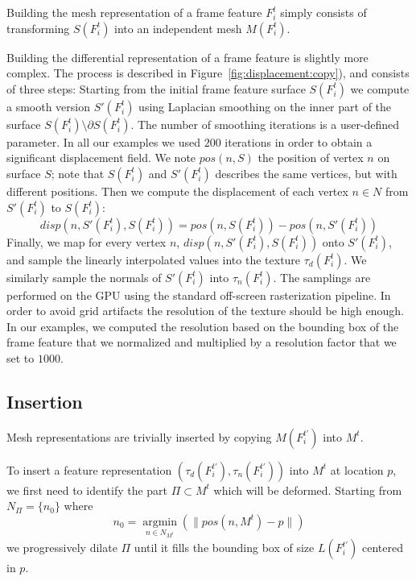 \documentclass[review]{acmsiggraph}
\begin{document}
Building the mesh representation of a frame feature $F^t_i$ simply consists of transforming $S(F^t_i)$ into an independent mesh $M(F^t_i)$.

Building the differential representation of a frame feature is slightly more complex.
The process is described in Figure~\ref{fig:displacement:copy}), and consists of three steps:
%
Starting from the initial frame feature surface $S(F^t_i)$ we compute a smooth version $S'(F^t_i)$ using Laplacian smoothing on the inner part of the surface $S(F^t_i) \setminus \partial S(F^t_i)$. The number of smoothing iterations is a user-defined parameter. In all our examples we used $200$ iterations in order to obtain a significant displacement field.
We note $pos(n, S)$ the position of vertex $n$ on surface $S$; note that $S(F^t_i)$ and $S'(F^t_i)$ describes the same vertices, but with different positions.
%
Then we compute the displacement of each vertex $n \in N$ from $S'(F^t_i)$ to $S(F^t_i)$:
\begin{equation}
    disp(n,S'(F^t_i), S(F^t_i) ) = pos(n, S(F^t_i)) - pos(n, S'(F^t_i))
\end{equation}
%
Finally, we map for every vertex $n$, $disp(n,S'(F^t_i), S(F^t_i))$ onto $S'(F^t_i)$, and sample the linearly interpolated values into the texture $\tau_d(F^t_i)$.
We similarly sample the normals of $S'(F^t_i)$ into $\tau_n(F^t_i)$.
The samplings are performed on the GPU using the standard off-screen rasterization pipeline.
In order to avoid grid artifacts the resolution of the texture should be high enough. 
In our examples, we computed the resolution based on the bounding box of the frame feature that we normalized and multiplied by a resolution factor that we set to $1000$.
\subsection{Insertion}
\label{sec:representation:insertion}

Mesh representations are trivially inserted by copying $M(F^{t'}_i)$ into $M^t$.

To insert a feature representation $(\tau_d(F^{t'}_i), \tau_n(F^{t'}_i))$ into $M^t$ at location $p$, we first need to identify the part $\Pi \subset M^t$ which will be deformed.
Starting from $N_{\Pi} = \{n_0\}$ where
\begin{equation}
n_0=\underset{n\in N_{M^t}}{\operatorname{argmin}}(\|pos(n, M^t) - p\|)
\end{equation}
we progressively dilate $\Pi$ until it fills the bounding box of size $L(F^{t'}_i)$ centered in $p$.
\end{document}
